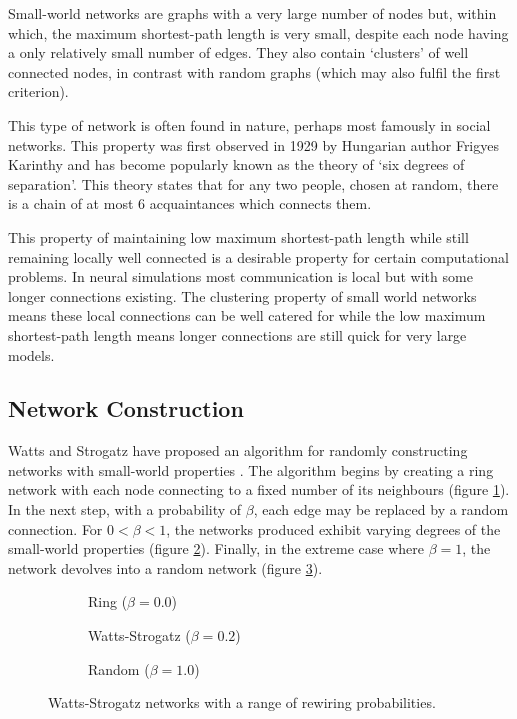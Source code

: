 		Small-world networks are graphs with a very large number of nodes but,
		within which, the maximum shortest-path length is very small, despite each
		node having a only relatively small number of edges. They also contain
		`clusters' of well connected nodes, in contrast with random graphs (which
		may also fulfil the first criterion).
		
		This type of network is often found in nature, perhaps most famously in
		social networks. This property was first observed in 1929 by Hungarian
		author Frigyes Karinthy\cite{karinthy29} and has become popularly known as
		the theory of `six degrees of separation'. This theory states that for any
		two people, chosen at random, there is a chain of at most 6 acquaintances
		which connects them.
		
		This property of maintaining low maximum shortest-path length while still
		remaining locally well connected is a desirable property for certain
		computational problems. In neural simulations most communication is local
		but with some longer connections existing. The clustering property of small
		world networks means these local connections can be well catered for while
		the low maximum shortest-path length means longer connections are still
		quick for very large models.
		
		\subsection{Network Construction}
		
			Watts and Strogatz have proposed an algorithm for randomly constructing
			networks with small-world properties \cite{watts98}. The algorithm begins
			by creating a ring network with each node connecting to a fixed number of
			its neighbours (figure \ref{fig:ringNetworkB0}). In the next step, with a
			probability of $\beta$, each edge may be replaced by a random connection.
			For $0 < \beta < 1$, the networks produced exhibit varying degrees of the
			small-world properties (figure \ref{fig:ringNetworkB02}).  Finally, in the
			extreme case where $\beta=1$, the network devolves into a random network
			(figure \ref{fig:ringNetworkB1}).
			
			\begin{figure}
				\center
				\begin{subfigure}[t]{0.3\textwidth}
					\center
					
					\caption{Ring ($\beta = 0.0$)}
					\label{fig:ringNetworkB0}
				\end{subfigure}
				\begin{subfigure}[t]{0.3\textwidth}
					\center
					
					\caption{Watts-Strogatz ($\beta = 0.2$)}
					\label{fig:ringNetworkB02}
				\end{subfigure}
				\begin{subfigure}[t]{0.3\textwidth}
					\center
					
					\caption{Random ($\beta = 1.0$)}
					\label{fig:ringNetworkB1}
				\end{subfigure}
				
				\caption{Watts-Strogatz networks with a range of rewiring
				probabilities.}
				\label{fig:ringNetwork}
			\end{figure}
			
